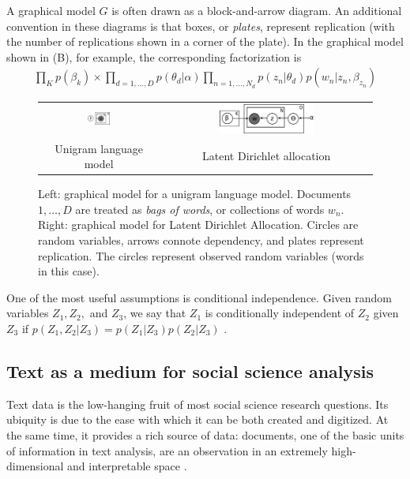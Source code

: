 A graphical model $G$ is often drawn as a block-and-arrow diagram.  An
additional convention in these diagrams is that boxes, or
\emph{plates}, represent replication (with the number of replications
shown in a corner of the plate). In the graphical model shown in
 (B), for example, the corresponding factorization is
\begin{align}
  \prod_K p(\beta_k) \times \prod_{d=1,\ldots,D} p(\theta_d | \alpha) \prod_{n=1,\ldots,N_d} p(z_n | \theta_d) p(w_n | z_n, \beta_{z_n})
\end{align}

\begin{figure}
  \begin{center}
    \begin{tabular}{cc}
      \includegraphics[width=0.2\textwidth]{chapter_introductory_material/figs/bagofwords_gm.pdf} & 
      \includegraphics[width=0.4667\textwidth]{chapter_introductory_material/figs/lda_gm.pdf} \\
      Unigram language model & Latent Dirichlet allocation \\
    \end{tabular}
  \end{center}
  \caption{Left: graphical model for a unigram language model.  Documents $1, \ldots, D$ are
    treated as \emph{bags of words}, or collections of words $w_n$.
    Right: graphical model for Latent Dirichlet Allocation.  Circles are random variables, arrows connote dependency, and plates represent replication.  The circles represent observed random variables (words in this case).}
  \label{figure:bagofwords_lda_gm}
\end{figure}

One of the most useful assumptions is conditional independence.  Given
random variables $Z_1, Z_2,$ and $Z_3$, we say that $Z_1$ is
conditionally independent of $Z_2$ given $Z_3$ if $p(Z_1, Z_2 | Z_3) =
p(Z_1 | Z_3) p(Z_2 | Z_3)$ \cite{bishop:2006}.

\subsection{Text as a medium for social science analysis}
  \label{section:text_intro}
  Text data is the low-hanging fruit of most social science research
  questions.  Its ubiquity is due to the ease with which it can be
  both created and digitized.  At the same time, it provides a rich
  source of data: documents, one of the basic units of information in
  text analysis, are an observation in an extremely high-dimensional
  and interpretable space \cite{changrtl:2009}.

